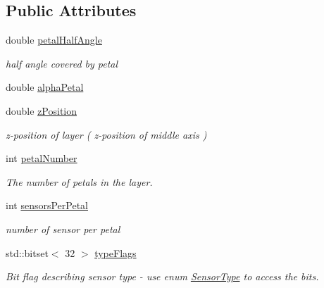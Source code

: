 \subsection*{Public Attributes}
\begin{DoxyCompactItemize}
\item 
double \hyperlink{struct_d_d4hep_1_1_d_d_rec_1_1_z_disk_petals_struct_1_1_layer_layout_a85cf828a62962381c4db27d71a536dfa}{petalHalfAngle}
\begin{DoxyCompactList}\small\item\em half angle covered by petal \item\end{DoxyCompactList}\item 
double \hyperlink{struct_d_d4hep_1_1_d_d_rec_1_1_z_disk_petals_struct_1_1_layer_layout_a8e5089dc9e7157730d3c3773ed6f285c}{alphaPetal}
\item 
double \hyperlink{struct_d_d4hep_1_1_d_d_rec_1_1_z_disk_petals_struct_1_1_layer_layout_a2b501a3aa1eb000afd0c2b15a3fa3ff0}{zPosition}
\begin{DoxyCompactList}\small\item\em z-\/position of layer ( z-\/position of middle axis ) \item\end{DoxyCompactList}\item 
int \hyperlink{struct_d_d4hep_1_1_d_d_rec_1_1_z_disk_petals_struct_1_1_layer_layout_a4b7640805517bd0d1cb1d2d6aa3ddb99}{petalNumber}
\begin{DoxyCompactList}\small\item\em The number of petals in the layer. \item\end{DoxyCompactList}\item 
int \hyperlink{struct_d_d4hep_1_1_d_d_rec_1_1_z_disk_petals_struct_1_1_layer_layout_af4b922495a14cb54c5d6412ef1097d52}{sensorsPerPetal}
\begin{DoxyCompactList}\small\item\em number of sensor per petal \item\end{DoxyCompactList}\item 
std::bitset$<$ 32 $>$ \hyperlink{struct_d_d4hep_1_1_d_d_rec_1_1_z_disk_petals_struct_1_1_layer_layout_a20e5c894370d93b960dccbb7b31d167c}{typeFlags}
\begin{DoxyCompactList}\small\item\em Bit flag describing sensor type -\/ use enum \hyperlink{struct_d_d4hep_1_1_d_d_rec_1_1_z_disk_petals_struct_1_1_sensor_type}{SensorType} to access the bits. \item\end{DoxyCompactList}\item 

\end{DoxyCompactItemize}

